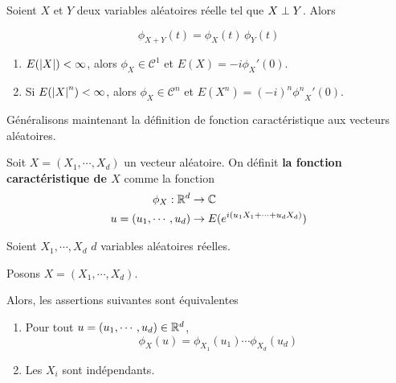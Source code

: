 \begin{theorem}
	Soient $X$ et $Y$ deux variables aléatoires réelle tel que $X
	\perp Y$.
	Alors

	\begin{equation}
		\phi_{X + Y}(t) = \phi_{X}(t) \, \phi_{Y}(t)
	\end{equation}
\end{theorem}

\begin{proposition}
	\begin{enumerate}
		\item $E(\abs{X}) < \infty$, alors $\phi_{X} \in \mathcal{C}^{1}$ et
			$E(X) = -i \phi_{X}'(0)$.
		\item Si $E(\abs{X}^{n}) < \infty$, alors $\phi_{X} \in
			\mathcal{C}^{n}$ et $E(X^{n}) = (-i)^{n} {\phi^{n}}_{X}'(0)$.
	\end{enumerate}
\end{proposition}

Généralisons maintenant la définition de fonction caractéristique aux vecteurs
aléatoires.

\begin{definition}
	Soit $X = (X_{1}, \cdots, X_{d})$ un vecteur aléatoire.
	On définit \textbf{la fonction caractéristique de $X$} comme la fonction
	\begin{align}
		\phi_{X} : \mathbb{R}^{d} &\rightarrow \mathbb{C} \\
		u = (u_{1}, \cdots, u_{d}) &\rightarrow E(e^{i(u_{1} X_{1} + \cdots +
		u_{d} X_{d})})
		\label{equation:definition_fonction_caractéristique_vecteur}
	\end{align}
\end{definition}

\begin{theorem}
	Soient $X_{1}, \cdots, X_{d}$ $d$ variables aléatoires réelles.

	Posons $X = (X_{1}, \cdots, X_{d})$.

	Alors, les assertions suivantes sont équivalentes
	\begin{enumerate}
		\item Pour tout $u = (u_{1}, \cdots, u_{d}) \in \mathbb{R}^{d}$,
				\begin{equation}
					\phi_{X}(u) = \phi_{X_{1}}(u_{1}) \cdots \phi_{X_{d}}(u_{d})
				\end{equation}
		\item Les $X_{i}$ sont indépendants.
	\end{enumerate}
\end{theorem}

